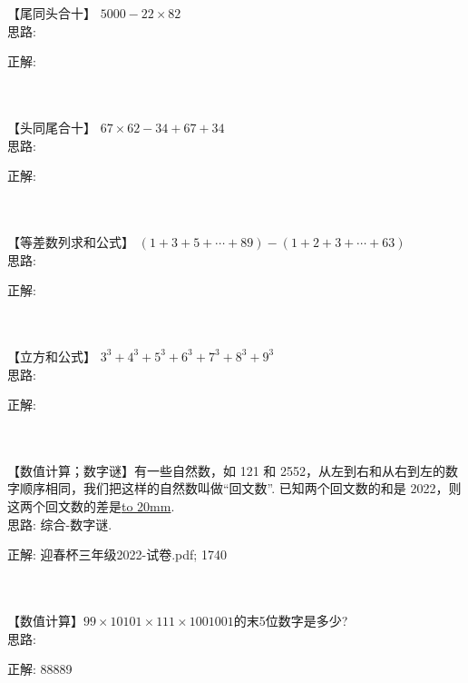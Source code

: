\item {
    【尾同头合十】
    $5000- 22\times 82$  
    \ifshowSolution
        \fangsong{}
        \\
        思路:

        正解: 
    \else
        \\ \\ \\
    \fi
}


\item {
    【头同尾合十】
    $67\times 62 - 34 + 67 + 34$
    \ifshowSolution
        \fangsong{}
        \\
        思路:

        正解: 
    \else
        \\ \\ \\
    \fi
}

\item {
    【等差数列求和公式】
    $(1+3+5+\cdots + 89) - (1+2+3+\cdots + 63)$  
    \ifshowSolution
        \fangsong{}
        \\
        思路:

        正解: 
    \else
        \\ \\ \\
    \fi
}

\item {
    【立方和公式】
    $3^3 + 4^3 + 5^3 + 6^3 + 7^3 + 8^3 + 9^3$
    \ifshowSolution
        \fangsong{}
        \\
        思路:

        正解: 
    \else
        \\ \\ \\
    \fi
}

\item {
    【数值计算；数字谜】有一些自然数，如 121 和 2552，从左到右和从右到左的数字顺序相同，我们把这样的自然数叫做``回文数''. 已知两个回文数的和是 2022，则这两个回文数的差是\underline{\hbox to 20mm{}}.
    \ifshowSolution
        \fangsong{}
        \\
        思路: 综合-数字谜.

        正解:  迎春杯三年级2022-试卷.pdf; 1740
    \else
        \\ \\ \\
    \fi
}


\item {
    【数值计算】$99\times 10101\times 111\times 1001001$的末5位数字是多少?
    \ifshowSolution
        \fangsong{}
        \\
        思路:

        正解: 88889
    \else
        \\ \\ \\
    \fi
}
